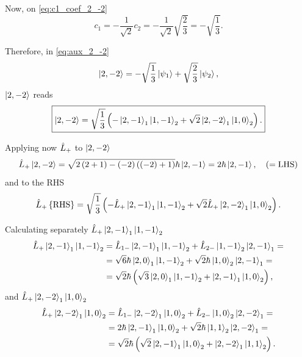 Now, on \cref{eq:c1_coef_2_-2} 
\begin{equation}
    c_1 =
    - \frac{1}{\sqrt{2}} c_2 =
    - \frac{1}{\sqrt{2}} \sqrt{\frac{2}{3}} =
    - \sqrt{\frac{1}{3}}.
\end{equation}

Therefore, in \cref{eq:aux_2_-2} 
\begin{equation}
    \Ket{2,-2} =
    - \sqrt{\frac{1}{3}} \Ket{\psi_1}
    + \sqrt{\frac{2}{3}} \Ket{\psi_2},
\end{equation}
$\Ket{2,-2}$ reads
\begin{equation}
    \boxed{
        \Ket{2,-2} =
        \sqrt{\frac{1}{3}} \left( 
            - \Ket{2,-1}_1 \Ket{1,-1}_2
            + \sqrt{2} \Ket{2,-2}_1 \Ket{1,0}_2
        \right) .
        }
\end{equation}

Applying now $\hat{L}_{+}$ to $\Ket{2,-2}$ 
\begin{equation}
    \hat{L}_{+} \Ket{2,-2} =
    \sqrt{2\left( 2 + 1 \right) - \left( -2 \right)\left( \left( -2 \right) + 1 \right)} \hbar \Ket{2,-1} =
    2 \hbar \Ket{2,-1},
    \quad \left( =\text{LHS} \right)
\end{equation}
and to the RHS 
\begin{equation}\label{eq:RHS_2_-1_aux}
    \hat{L}_{+} \left\{ \text{RHS} \right\} =
    \sqrt{\frac{1}{3}} \left( 
        - \hat{L}_{+} \Ket{2,-1}_1 \Ket{1,-1}_2
        + \sqrt{2} \hat{L}_{+} \Ket{2,-2}_1 \Ket{1,0}_2
    \right).
\end{equation}

Calculating separately $\hat{L}_{+} \Ket{2,-1}_1 \Ket{1,-1}_2$ 
\begin{align}
    \notag
    \hat{L}_{+} \Ket{2,-1}_1 \Ket{1,-1}_2 &=
    \hat{L}_{1-} \Ket{2,-1}_1 \Ket{1,-1}_2 
    + 
    \hat{L}_{2-} \Ket{1,-1}_2 \Ket{2,-1}_1
    = \\
    \notag
    &=
    \sqrt{6} \hbar \Ket{2,0}_1 \Ket{1,-1}_2
    +
    \sqrt{2} \hbar \Ket{1,0}_2 \Ket{2,-1}_1
    = \\
    &=
    \sqrt{2} \hbar \left( 
        \sqrt{3} \Ket{2,0}_1 \Ket{1,-1}_2
        +
        \Ket{2,-1}_1 \Ket{1,0}_2 
    \right),
\end{align}
and $\hat{L}_{+} \Ket{2,-2}_1 \Ket{1,0}_2$
\begin{align}
    \notag
    \hat{L}_{+} \Ket{2,-2}_1 \Ket{1,0}_2 &=
    \hat{L}_{1-} \Ket{2,-2}_1 \Ket{1,0}_2 
    + 
    \hat{L}_{2-} \Ket{1,0}_2 \Ket{2,-2}_1
    = \\
    \notag
    &=
    2 \hbar \Ket{2,-1}_1 \Ket{1,0}_2
    +
    \sqrt{2} \hbar \Ket{1,1}_2 \Ket{2,-2}_1
    = \\
    &=
    \sqrt{2} \hbar \left( 
        \sqrt{2} \Ket{2,-1}_1 \Ket{1,0}_2 
        +
        \Ket{2,-2}_1 \Ket{1,1}_2 
    \right).
\end{align}

